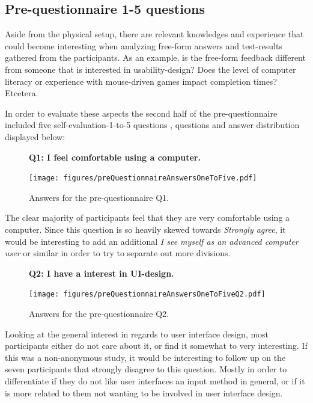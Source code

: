 \documentclass[nofilelist,dvipsnames]{cslthse-msc}
\begin{document}
			\subsection{Pre-questionnaire 1-5 questions}

        Aside from the physical setup, there are relevant knowledges and
        experience that could become interesting when analyzing free-form
        answers and test-results gathered from the participants. As an example,
        is the free-form feedback different from someone that is interested in
        usability-design? Does the level of computer literacy or experience
        with mouse-driven games impact completion times? Etcetera.

        In order to evaluate these aspects the second half of the
        pre-questionnaire included five self-evaluation-1-to-5 questions
        , questions and answer distribution
        displayed below:

				\begin{figure}[h!]
          \textbf{Q1: I feel comfortable using a computer.}
          \begin{center}
            \texttt{[image: figures/preQuestionnaireAnswersOneToFive.pdf]}
            \vspace{-1cm}
            \caption{Answers for the pre-questionnaire Q1.}
          \end{center}
				\end{figure}

        The clear majority of participants feel that they are very comfortable
        using a computer. Since this question is so heavily skewed towards
        \textit{Strongly agree}, it would be interesting to add an additional
        \textit{I see myself as an advanced computer user} or similar in order
        to try to separate out more divisions.

				\begin{figure}[h!]
          \textbf{Q2: I have a interest in UI-design.}
          \begin{center}
            \texttt{[image: figures/preQuestionnaireAnswersOneToFiveQ2.pdf]}
            \vspace{-1cm}
            \caption{Answers for the pre-questionnaire Q2.}
          \end{center}
				\end{figure}

        Looking at the general interest in regards to user interface design,
        most participants either do not care about it, or find it somewhat to
        very interesting. If this was a non-anonymous study, it would be
        interesting to follow up on the seven participants that strongly
        disagree to this question. Mostly in order to differentiate if they do
        not like user interfaces an input method in general, or if it is more
        related to them not wanting to be involved in user interface design.
\end{document}
